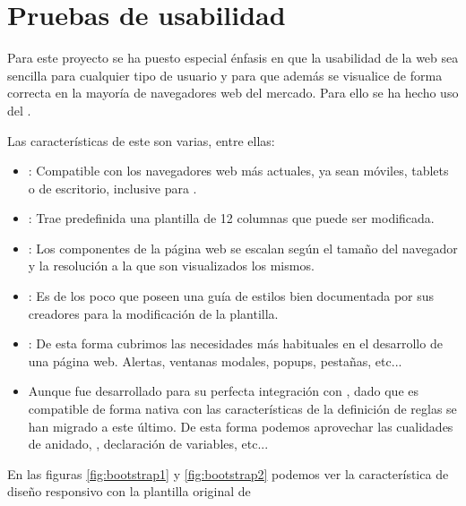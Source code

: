 \section{Pruebas de usabilidad}
Para este proyecto se ha puesto especial énfasis en que la usabilidad de la web
sea sencilla para cualquier tipo de usuario y para que además se visualice de
forma correcta en la mayoría de navegadores web del mercado. Para ello se ha
hecho uso del  
\cite{prog:twitter_bootstrap}.

Las características de este  son varias, entre ellas:

\begin{itemize}
\item {}: Compatible con los navegadores web más actuales, ya sean
  móviles, tablets o de escritorio, inclusive para .
\item {}: Trae predefinida una plantilla de 12 columnas que
  puede ser modificada.
\item {}: Los componentes de la página web se escalan
  según el tamaño del navegador y la resolución a la que son visualizados los
  mismos.
\item {}: Es de los poco  que poseen una guía de estilos bien documentada por sus creadores para
  la modificación de la plantilla.
\item {}: De esta forma cubrimos las
  necesidades más habituales en el desarrollo de una página web. Alertas,
  ventanas modales, popups, pestañas, etc...
\item {} Aunque 
  fue desarrollado para su perfecta integración con , dado que
   es compatible de forma nativa con  las
  características de la definición de reglas se han migrado a este último. De
  esta forma podemos aprovechar las cualidades de anidado, ,
  declaración de variables, etc...
\end{itemize}

En las figuras \ref{fig:bootstrap1} y \ref{fig:bootstrap2} podemos ver la
característica de diseño responsivo con la plantilla original de

\newpage
{}


